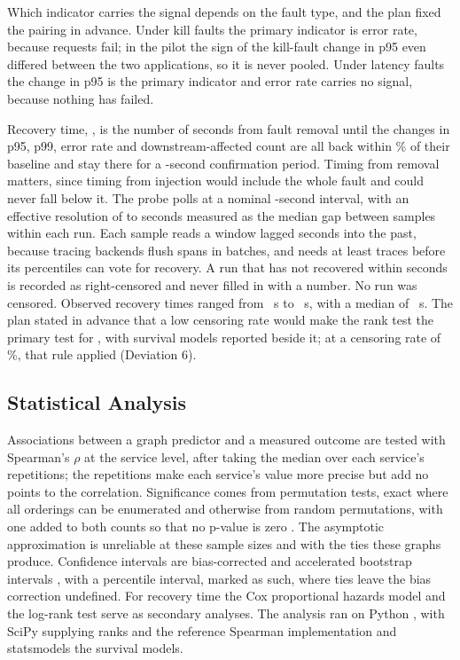 Which indicator carries the signal depends on the fault type, and the plan fixed the pairing in
advance. Under kill faults the primary indicator is error rate, because requests fail; in the
pilot the sign of the kill-fault change in p95 even differed between the two applications, so
it is never pooled. Under latency faults the change in p95 is the primary indicator and error
rate carries no signal, because nothing has failed.

Recovery time, \Trec, is the number of seconds from fault removal until the changes in p95, p99,
error rate and downstream-affected count are all back within
\% of their baseline and stay
there for a -second confirmation period. Timing from removal matters,
since timing from injection would include the whole fault and could never fall below it. The
probe polls at a nominal -second interval, with an effective
resolution of  to  seconds
measured as the median gap between samples within each run. Each sample reads a window lagged
 seconds into the past, because tracing backends flush spans in
batches, and needs at least  traces before its percentiles can vote for
recovery. A run that has not recovered within  seconds is recorded
as right-censored and never filled in with a number. No run was censored.
Observed recovery times ranged from ~s to ~s, with a median of
~s. The plan stated in advance that a low censoring rate would make the rank
test the primary test for \Trec, with survival models reported beside it; at a censoring rate of
\%, that rule applied (Deviation 6).

\subsection{Statistical Analysis}
\label{sec:stats}

Associations between a graph predictor and a measured outcome are tested with Spearman's
$\rho$ at the service level, after taking the median over each service's repetitions; the
repetitions make each service's value more precise but add no points to the correlation.
Significance comes from permutation tests, exact where all orderings can be enumerated and
otherwise from  random permutations, with one added to both counts
so that no p-value is zero \cite{phipson2010}. The asymptotic approximation is unreliable at
these sample sizes and with the ties these graphs produce. Confidence intervals are
bias-corrected and accelerated bootstrap intervals \cite{efron1987}, with a percentile interval,
marked as such, where ties leave the bias correction undefined. For recovery time the Cox
proportional hazards model \cite{cox1972} and the log-rank test serve as secondary analyses. The
analysis ran on Python , with SciPy  supplying ranks and
the reference Spearman implementation and statsmodels  the survival
models.

